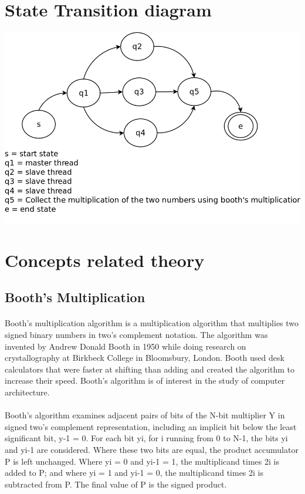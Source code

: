 \documentclass[10pt,a4paper]{article}
\begin{document}
\section{State Transition diagram}
\includegraphics[scale=0.30]{stdg.png}

\section{Concepts related theory}
\subsection{Booth's Multiplication}
	\paragraph{} Booth's multiplication algorithm is a multiplication algorithm that multiplies two signed binary numbers in two's complement notation. The algorithm was invented by Andrew Donald Booth in 1950 while doing research on crystallography at Birkbeck College in Bloomsbury, London. Booth used desk calculators that were faster at shifting than adding and created the algorithm to increase their speed. Booth's algorithm is of interest in the study of computer architecture.
	\paragraph{} Booth's algorithm examines adjacent pairs of bits of the N-bit multiplier Y in signed two's complement representation, including an implicit bit below the least significant bit, y-1 = 0. For each bit yi, for i running from 0 to N-1, the bits yi and yi-1 are considered. Where these two bits are equal, the product accumulator P is left unchanged. Where yi = 0 and yi-1 = 1, the multiplicand times 2i is added to P; and where yi = 1 and yi-1 = 0, the multiplicand times 2i is subtracted from P. The final value of P is the signed product.
\end{document}
